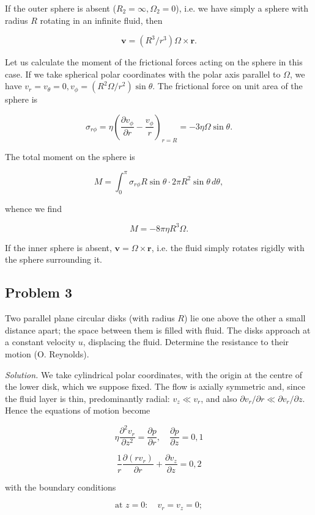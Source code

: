 \documentclass{article}
\begin{document}
If the outer sphere is absent ($R_2 = \infty, \Omega_2 = 0$), i.e. we have simply a sphere with radius $R$ rotating in an infinite fluid, then

$$
\mathbf{v} = (R^3/r^3) \Omega \times \mathbf{r}.
$$

Let us calculate the moment of the frictional forces acting on the sphere in this case. If we take spherical polar coordinates with the polar axis parallel to $\Omega$, we have $v_r = v_\theta = 0, v_\phi = (R^2 \Omega/r^2) \sin \theta$. The frictional force on unit area of the sphere is

$$
\sigma_{r\phi} = \eta \left( \frac{\partial v_\phi}{\partial r} - \frac{v_\phi}{r} \right)_{r=R} = -3\eta \Omega \sin \theta.
$$

The total moment on the sphere is

$$
M = \int_0^\pi \sigma_{r\phi} R \sin \theta \cdot 2\pi R^2 \sin \theta \, d\theta,
$$

whence we find

$$
M = -8\pi \eta R^3 \Omega.
$$

If the inner sphere is absent, $\mathbf{v} = \Omega \times \mathbf{r}$, i.e. the fluid simply rotates rigidly with the sphere surrounding it.

\subsection*{Problem 3}

Two parallel plane circular disks (with radius $R$) lie one above the other a small distance apart; the space between them is filled with fluid. The disks approach at a constant velocity $u$, displacing the fluid. Determine the resistance to their motion (O. Reynolds).

\textit{Solution.} We take cylindrical polar coordinates, with the origin at the centre of the lower disk, which we suppose fixed. The flow is axially symmetric and, since the fluid layer is thin, predominantly radial: $v_z \ll v_r$, and also $\partial v_r/\partial r \ll \partial v_r/\partial z$. Hence the equations of motion become

$$
\eta \frac{\partial^2 v_r}{\partial z^2} = \frac{\partial p}{\partial r}, \quad \frac{\partial p}{\partial z} = 0, {1}
$$

$$
\frac{1}{r} \frac{\partial (rv_r)}{\partial r} + \frac{\partial v_z}{\partial z} = 0, {2}
$$

with the boundary conditions

$$
\text{at } z = 0: \quad v_r = v_z = 0;
$$
\end{document}

